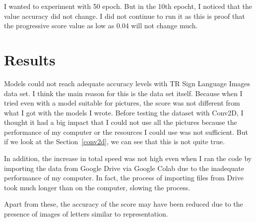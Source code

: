 \documentclass{article}
\begin{document}
\begin{flushleft}
I wanted to experiment with 50 epoch. But in the 10th epocht, I noticed that the value accuracy did not change. I did not continue to run it as this is proof that the progressive score value as low as 0.04 will not change much.

\section{Results}
Models could not reach adequate accuracy levels with TR Sign Language Images data set. I think the main reason for this is the data set itself. Because when I tried even with a model suitable for pictures, the score was not different from what I got with the models I wrote. Before testing the dataset with Conv2D, I thought it had a big impact that I could not use all the pictures because the performance of my computer or the resources I could use was not sufficient. But if we look at the Section~\ref{conv2d}, we can see that this is not quite true.

\vspace{2mm}
In addition, the increase in total speed was not high even when I ran the code by importing the data from Google Drive via Google Colab due to the inadequate performance of my computer. In fact, the process of importing files from Drive took much longer than on the computer, slowing the process.

\vspace{2mm}
Apart from these, the accuracy of the score may have been reduced due to the presence of images of letters similar to representation.


\end{flushleft}
\end{document}
